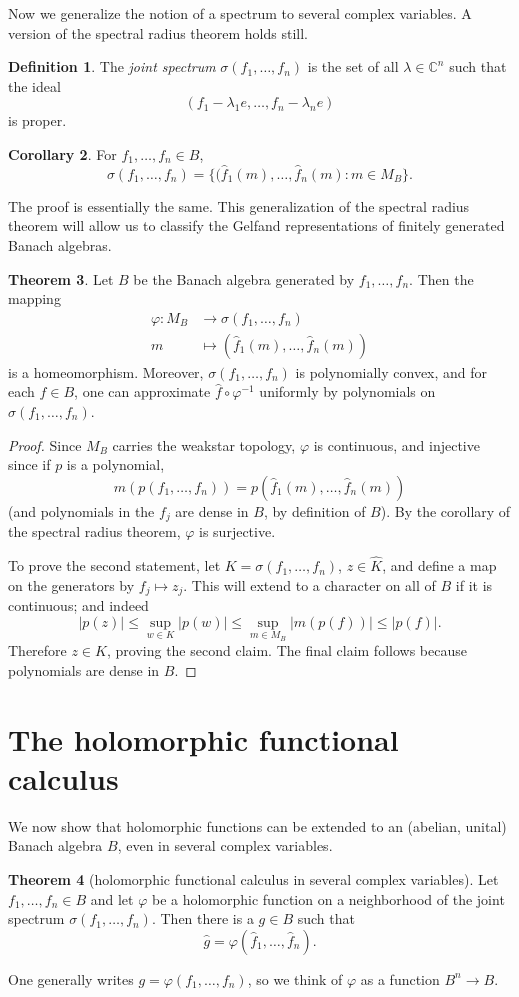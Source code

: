 \documentclass[12pt]{report}
\newcommand{\CC}{\mathbb{C}}
\newcommand{\dfn}[1]{\emph{#1}\index{#1}}
\theoremstyle{definition}
\newtheorem{theorem}{Theorem}[chapter]
\newtheorem{corollary}[theorem]{Corollary}
\newtheorem{definition}[theorem]{Definition}
\begin{document}
    Now we generalize the notion of a spectrum to several complex variables. A version of the spectral radius theorem holds still.
\begin{definition}
    The \dfn{joint spectrum} $\sigma(f_1, \dots, f_n)$ is the set of all $\lambda \in \CC^n$ such that the ideal
    $$(f_1 - \lambda_1 e, \dots, f_n -\lambda_n e)$$
    is proper.
\end{definition}
\begin{corollary}
    For $f_1, \dots, f_n \in B$,
    $$\sigma(f_1, \dots, f_n) = \{(\hat f_1(m), \dots, \hat f_n(m): m \in M_B\}.$$
\end{corollary}
    The proof is essentially the same. This generalization of the spectral radius theorem will allow us to classify the Gelfand representations of finitely generated Banach algebras.
\begin{theorem}
    Let $B$ be the Banach algebra generated by $f_1, \dots, f_n$. Then the mapping
\begin{align*}
    \varphi: M_B &\to \sigma(f_1, \dots, f_n)\\
    m &\mapsto (\hat f_1(m), \dots, \hat f_n(m))
\end{align*}
    is a homeomorphism. Moreover, $\sigma(f_1, \dots, f_n)$ is polynomially convex, and for each $f \in B$, one can approximate $\hat f \circ \varphi^{-1}$ uniformly by polynomials on $\sigma(f_1, \dots, f_n)$.
\end{theorem}
\begin{proof}
    Since $M_B$ carries the weakstar topology, $\varphi$ is continuous, and injective since if $p$ is a polynomial,
    $$m(p(f_1, \dots, f_n)) = p(\hat f_1(m), \dots, \hat f_n(m))$$
    (and polynomials in the $f_j$ are dense in $B$, by definition of $B$). By the corollary of the spectral radius theorem, $\varphi$ is surjective.

    To prove the second statement, let $K = \sigma(f_1, \dots, f_n)$, $z \in \hat K$, and define a map on the generators by $f_j \mapsto z_j$. This will extend to a character on all of $B$ if it is continuous; and indeed
    $$|p(z)| \leq \sup_{w \in K} |p(w)| \leq \sup_{m \in M_B} |m(p(f))| \leq |p(f)|.$$
    Therefore $z \in K$, proving the second claim. The final claim follows because polynomials are dense in $B$.
\end{proof}

\section{The holomorphic functional calculus}
We now show that holomorphic functions can be extended to an (abelian, unital) Banach algebra $B$, even in several complex variables.
\begin{theorem}[holomorphic functional calculus in several complex variables]
    Let $f_1, \dots, f_n \in B$ and let $\varphi$ be a holomorphic function on a neighborhood of the joint spectrum $\sigma(f_1, \dots, f_n)$. Then there is a $g \in B$ such that
    $$\hat g = \varphi(\hat f_1, \dots, \hat f_n).$$
\end{theorem}
One generally writes $g = \varphi(f_1, \dots, f_n)$, so we think of $\varphi$ as a function $B^n \to B$.
\end{document}
